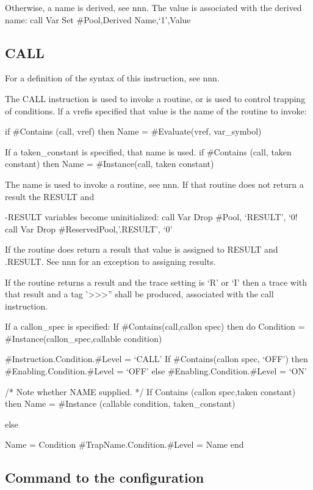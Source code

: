 Otherwise, a name is derived, see nnn. The value is associated with the
derived name: call Var Set \#Pool,Derived Name,`1',Value

\hypertarget{call}{%
\subsection{CALL}\label{call}}

For a definition of the syntax of this instruction, see nnn.

The CALL instruction is used to invoke a routine, or is used to control
trapping of conditions. lf a vrefis specified that value is the name of
the routine to invoke:

if \#Contains (call, vref) then Name = \#Evaluate(vref, var\_symbol)

If a taken\_constant is specified, that name is used. if \#Contains
(call, taken constant) then Name = \#Instance(call, taken constant)

The name is used to invoke a routine, see nnn. If that routine does not
return a result the RESULT and

-RESULT variables become uninitialized: call Var Drop \#Pool, `RESULT',
`0! call Var Drop \#ReservedPool,'.RESULT', `0'

If the routine does return a result that value is assigned to RESULT and
.RESULT. See nnn for an exception to assigning results.

If the routine returns a result and the trace setting is `R' or `I' then
a trace with that result and a tag
'\textgreater\textgreater\textgreater'' shall be produced, associated
with the call instruction.

If a callon\_spec is specified: If \#Contains(call,callon spec) then do
Condition = \#Instance(callon\_spec,callable condition)

\#Instruction.Condition.\#Level = `CALL' If \#Contains(callon spec,
`OFF') then \#Enabling.Condition.\#Level = `OFF' else
\#Enabling.Condition.\#Level = `ON'

/* Note whether NAME supplied. */ If Contains (callon spec,taken
constant) then Name = \#Instance (callable condition, taken\_constant)

else

Name = Condition \#TrapName.Condition.\#Level = Name end

\hypertarget{command-to-the-configuration}{%
\subsection{Command to the
configuration}\label{command-to-the-configuration}}

